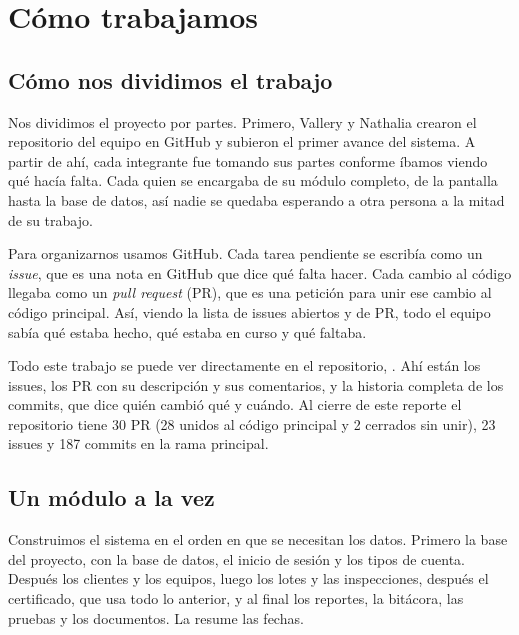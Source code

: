 \FloatBarrier
\section{Cómo trabajamos}\label{sec:proceso}

\subsection{Cómo nos dividimos el trabajo}\label{sec:reparto}

Nos dividimos el proyecto por partes. Primero, Vallery y Nathalia crearon el repositorio del equipo en GitHub y subieron el primer avance del sistema. A partir de ahí, cada integrante fue tomando sus partes conforme íbamos viendo qué hacía falta. Cada quien se encargaba de su módulo completo, de la pantalla hasta la base de datos, así nadie se quedaba esperando a otra persona a la mitad de su trabajo.

Para organizarnos usamos GitHub. Cada tarea pendiente se escribía como un \textit{issue}, que es una nota en GitHub que dice qué falta hacer. Cada cambio al código llegaba como un \textit{pull request} (PR), que es una petición para unir ese cambio al código principal. Así, viendo la lista de issues abiertos y de PR, todo el equipo sabía qué estaba hecho, qué estaba en curso y qué faltaba.

Todo este trabajo se puede ver directamente en el repositorio, \urlrepo{}. Ahí están los issues, los PR con su descripción y sus comentarios, y la historia completa de los commits, que dice quién cambió qué y cuándo. Al cierre de este reporte el repositorio tiene 30 PR (28 unidos al código principal y 2 cerrados sin unir), 23 issues y 187 commits en la rama principal.

\subsection{Un módulo a la vez}\label{sec:incremental}

Construimos el sistema en el orden en que se necesitan los datos. Primero la base del proyecto, con la base de datos, el inicio de sesión y los tipos de cuenta. Después los clientes y los equipos, luego los lotes y las inspecciones, después el certificado, que usa todo lo anterior, y al final los reportes, la bitácora, las pruebas y los documentos. La  resume las fechas.


